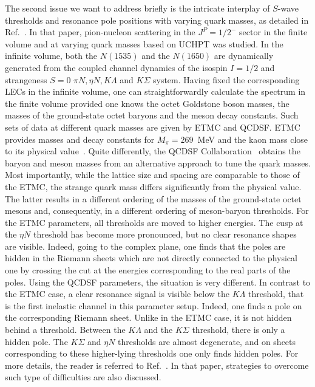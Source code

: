 The second issue we want to address briefly is the intricate interplay
of $S$-wave thresholds and resonance pole positions with varying quark masses,
as detailed in Ref.~\cite{Doring:2013glu}. In that paper, pion-nucleon
scattering in the $J^P = 1/2^-$ sector in the finite volume and at
varying quark masses based on UCHPT was studied. In the infinite volume,
both the $N(1535)$ and the  $N(1650)$ are dynamically generated
from the coupled channel dynamics of the isospin $I=1/2$ and strangeness
$S=0$ $\pi N, \eta N, K\Lambda$  and $K\Sigma$ system. Having fixed the
corresponding LECs in the infinite volume, one can straightforwardly
calculate the spectrum in the finite volume provided one knows the
octet Goldstone boson masses, the masses of the ground-state octet 
baryons and the meson decay constants. Such sets of data at different
quark masses are given by ETMC and QCDSF. ETMC provides masses
and decay constants for $M_\pi=269$~MeV and the kaon mass 
close to its physical value~\cite{Alexandrou:2009qu,Ottnad:2012fv}.
Quite differently, the QCDSF Collaboration~\cite{Bietenholz:2011qq}
obtains the baryon and meson masses  from an alternative approach to 
tune the quark masses. Most importantly, while the lattice size and 
spacing are comparable to those of the ETMC, the strange quark mass 
differs significantly from the physical value. The latter results in a
different ordering of the masses of the ground-state octet mesons and, 
consequently, in a different ordering of meson-baryon thresholds.
For the ETMC parameters,  all thresholds are moved to higher energies. 
The cusp at the $\eta N$ threshold has become more pronounced, but
no clear resonance shapes are visible. Indeed, going to the complex
plane, one finds that the poles are hidden {in the Riemann sheets which
are not directly connected to the physical one by crossing the cut at the
energies corresponding to the real parts of the poles}.
Using the QCDSF parameters, the situation is very different. In contrast to the ETMC case, a 
clear resonance signal is visible below the $K\Lambda$ threshold, 
that is the first inelastic channel in this parameter setup. Indeed, one
finds a pole  on the corresponding Riemann sheet. Unlike in the 
ETMC case, it is not hidden behind a threshold. Between
the $K\Lambda$ and the $K\Sigma$ threshold, there is only a hidden pole. 
The $K\Sigma$ and $\eta N$ thresholds are almost
degenerate, and on sheets corresponding to these higher-lying 
thresholds one only finds hidden poles. For more details, the reader
is referred to Ref.~\cite{Doring:2013glu}. In that paper, strategies
to overcome such type of difficulties are also discussed.

